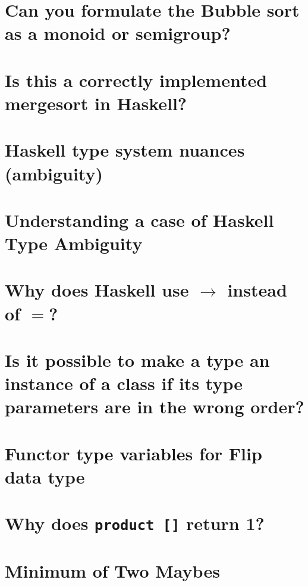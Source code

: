 \documentclass{book}
\begin{document}
\section{Can you formulate the Bubble sort as a monoid or semigroup?}


\section{Is this a correctly implemented mergesort in Haskell?}


\section{Haskell type system nuances (ambiguity)}


\section{Understanding a case of Haskell Type Ambiguity}


\section{Why does Haskell use $\to$ instead of $=$?}


\section{Is it possible to make a type an instance of a class if its type parameters are in the wrong order?}


\section{Functor type variables for Flip data type}


\section{Why does {\tt product []} return 1?}


\section{Minimum of Two Maybes}

\end{document}
